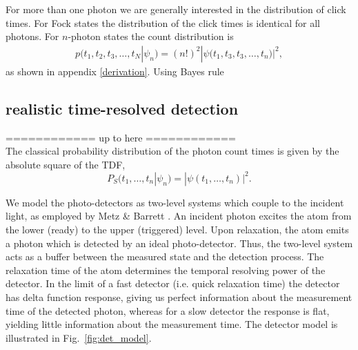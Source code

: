\documentclass[aps,pra,twocolumn,amsmath,amssymb,color,superscriptaddress]{revtex4}
\newcommand{\blue}{\color{blue}}
\begin{document}
For more than one photon we are generally interested in the distribution of click times. For Fock states the distribution of the click times is identical for all photons. For $n$-photon states the count distribution is    
\begin{align}
p(t_1,t_2,t_3, \ldots, t_N|\psi_n) = (n!)^2   |\psi\big(t_1,t_3,t_3,\ldots, t_n \big)|^2,
\end{align}
as shown in appendix \ref{derivation}. Using Bayes rule


 \subsection{realistic time-resolved detection}

{\blue ============ up to here ============}\\
The classical probability distribution {\blue of the photon count times} is given by the absolute square of the TDF,
\begin{equation}
P_S(t_1,\dots,t_n|\psi_n)=|\psi(t_1,\dots,t_n)|^2.
\end{equation}

We model the photo-detectors as two-level systems which couple to the incident light, as employed by Metz \& Barrett \cite{bib:metz2008effect}. An incident photon excites the atom from the lower (ready) to the upper (triggered) level. Upon relaxation, the atom emits a photon which is detected by an ideal photo-detector. Thus, the two-level system acts as a buffer between the measured state and the detection process. The relaxation time of the atom determines the temporal resolving power of the detector. In the limit of a fast detector (i.e. quick relaxation time) the detector has delta function response, giving us perfect information about the measurement time of the detected photon, whereas for a slow detector the response is flat, yielding little information about the measurement time. The detector model is illustrated in Fig.~\ref{fig:det_model}.
\end{document}
